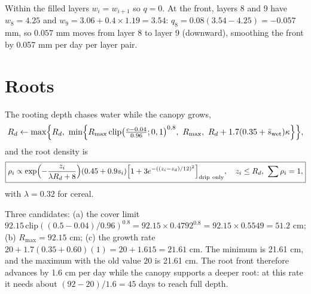  Within the filled layers $w_i=w_{i+1}$ so $q=0$. At the front, layers 8 and 9 have $w_8=4.25$ and $w_9=3.06+0.4\times1.19=3.54$: $q_8=0.08(3.54-4.25)=-0.057$ mm, so $0.057$ mm moves from layer 8 to layer 9 (downward), smoothing the front by 0.057 mm per day per layer pair.


\section{Roots}
The rooting depth chases water while the canopy grows,
\begin{equation}R_d\leftarrow\max\Bigl\{R_d,\ \min\Bigl\{R_{\max}\,\mathrm{clip}\bigl(\tfrac{c-0.04}{0.96};0,1\bigr)^{0.8},\ R_{\max},\ R_d+1.7(0.35+\bar s_{\rm wet})\kappa\Bigr\}\Bigr\},\end{equation}
and the root density is
\begin{equation}\boxed{\rho_i\propto\exp\Bigl(-\frac{z_i}{\lambda R_d+8}\Bigr)(0.45+0.9s_i)\Bigl[1+3e^{-((z_i-z_d)/12)^2}\Bigr]_{\rm drip\ only},\quad z_i\le R_d,\ \sum\rho_i=1,}\end{equation}
with $\lambda=0.32$ for cereal.

\sol  Three candidates: (a) the cover limit $92.15\,\mathrm{clip}((0.5-0.04)/0.96)^{0.8}=92.15\times0.4792^{0.8}=92.15\times0.5549=51.2$ cm; (b) $R_{\max}=92.15$ cm; (c) the growth rate $20+1.7(0.35+0.60)(1)=20+1.615=21.61$ cm. The minimum is 21.61 cm, and the maximum with the old value $20$ is 21.61 cm. The root front therefore advances by 1.6 cm per day while the canopy supports a deeper root: at this rate it needs about $(92-20)/1.6=45$ days to reach full depth.



